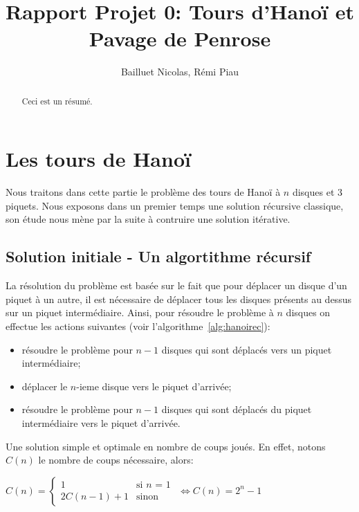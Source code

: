 \documentclass[a4paper,13pt]{article}
\begin{document}
\title{Rapport Projet 0: Tours d'Hanoï et Pavage de Penrose}

\author{Bailluet Nicolas, Rémi Piau}


\maketitle

\begin{abstract}
  Ceci est un résumé.
\end{abstract}


\section{Les tours de Hanoï}

Nous traitons dans cette partie le problème des tours de Hanoï à $n$ disques et 3 piquets. Nous exposons dans un premier temps une solution récursive classique, son étude nous mène par la suite à contruire une solution itérative.

\subsection{Solution initiale - Un algortithme récursif}

La résolution du problème est basée sur le fait que pour déplacer un disque d'un piquet à un autre, il est nécessaire de déplacer tous les disques présents au dessus sur un piquet intermédiaire. Ainsi, pour résoudre le problème à $n$ disques on effectue les actions suivantes (voir l'algorithme~\ref{alg:hanoirec}):
\begin{itemize}
  \item résoudre le problème pour $n-1$ disques qui sont déplacés vers un piquet intermédiaire;
  \item déplacer le $n$-ieme disque vers le piquet d'arrivée;
  \item résoudre le problème pour $n-1$ disques qui sont déplacés du piquet intermédiaire vers le piquet d'arrivée.
\end{itemize}

\bigskip
Une solution simple et optimale en nombre de coups joués. En effet, notons $C(n)$ le nombre de coups nécessaire, alors:\newline
\begin{center}
$
C(n) =
    \begin{cases}
      1 & \mbox{si $n$ = 1}\\
      2C(n-1)+1 & \mbox{sinon}
    \end{cases}
$
$
\Leftrightarrow \boxed{C(n) = 2^{n}-1}
$
\end{center}
\end{document}
